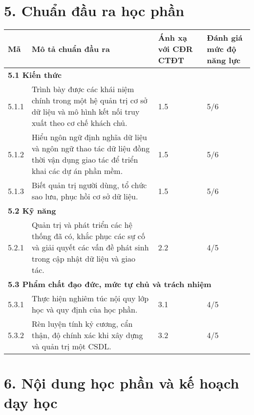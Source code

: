 \documentclass[a4paper,13pt]{article}
\begin{document}
\section*{5. Chuẩn đầu ra học phần}
\begin{longtable}{|p{2cm}|p{6.5cm}|p{2.5cm}|p{3cm}|}
\hline
\textbf{Mã} & \textbf{Mô tả chuẩn đầu ra} & \textbf{Ánh xạ với CĐR CTĐT} & \textbf{Đánh giá mức độ năng lực} \\
\hline
\multicolumn{4}{|l|}{\textbf{5.1 Kiến thức}} \\
\hline
5.1.1 & Trình bày được các khái niệm chính trong một hệ quản trị cơ sở dữ liệu và mô hình kết nối truy xuất theo cơ chế khách chủ. & 1.5 & 5/6 \\
\hline
5.1.2 & Hiểu ngôn ngữ định nghĩa dữ liệu và ngôn ngữ thao tác dữ liệu đồng thời vận dụng giao tác để triển khai các dự án phần mềm. & 1.5 & 5/6 \\
\hline
5.1.3 & Biết quản trị người dùng, tổ chức sao lưu, phục hồi cơ sở dữ liệu. & 1.5 & 5/6 \\
\hline
\multicolumn{4}{|l|}{\textbf{5.2 Kỹ năng}} \\
\hline
5.2.1 & Quản trị và phát triển các hệ thống đã có, khắc phục các sự cố và giải quyết các vấn đề phát sinh trong cập nhật dữ liệu và giao tác. & 2.2 & 4/5 \\
\hline
\multicolumn{4}{|l|}{\textbf{5.3 Phẩm chất đạo đức, mức tự chủ và trách nhiệm}} \\
\hline
5.3.1 & Thực hiện nghiêm túc nội quy lớp học và quy định của học phần. & 3.1 & 4/5 \\
\hline
5.3.2 & Rèn luyện tính kỷ cương, cẩn thận, độ chính xác khi xây dựng và quản trị một CSDL. & 3.2 & 4/5 \\
\hline
\end{longtable}

\section*{6. Nội dung học phần và kế hoạch dạy học}
\end{document}
